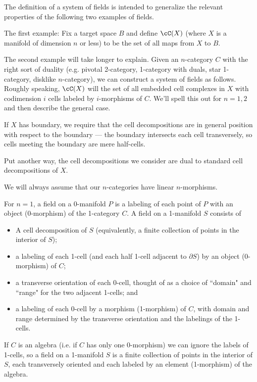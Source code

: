 \documentclass[11pt,leqno]{article}
\def\bd{\partial}
\begin{document}
The definition of a system of fields is intended to generalize 
the relevant properties of the following two examples of fields.

The first example: Fix a target space $B$ and define $\cC(X)$ (where $X$
is a manifold of dimension $n$ or less) to be the set of 
all maps from $X$ to $B$.

The second example will take longer to explain.
Given an $n$-category $C$ with the right sort of duality 
(e.g. pivotal 2-category, 1-category with duals, star 1-category, disklike $n$-category), 
we can construct a system of fields as follows.
Roughly speaking, $\cC(X)$ will the set of all embedded cell complexes in $X$
with codimension $i$ cells labeled by $i$-morphisms of $C$.
We'll spell this out for $n=1,2$ and then describe the general case.

If $X$ has boundary, we require that the cell decompositions are in general
position with respect to the boundary --- the boundary intersects each cell
transversely, so cells meeting the boundary are mere half-cells.

Put another way, the cell decompositions we consider are dual to standard cell
decompositions of $X$.

We will always assume that our $n$-categories have linear $n$-morphisms.

For $n=1$, a field on a 0-manifold $P$ is a labeling of each point of $P$ with
an object (0-morphism) of the 1-category $C$.
A field on a 1-manifold $S$ consists of
\begin{itemize}
	\item A cell decomposition of $S$ (equivalently, a finite collection
of points in the interior of $S$);
	\item a labeling of each 1-cell (and each half 1-cell adjacent to $\bd S$)
by an object (0-morphism) of $C$;
	\item a transverse orientation of each 0-cell, thought of as a choice of
``domain" and ``range" for the two adjacent 1-cells; and
	\item a labeling of each 0-cell by a morphism (1-morphism) of $C$, with
domain and range determined by the transverse orientation and the labelings of the 1-cells.
\end{itemize}

If $C$ is an algebra (i.e. if $C$ has only one 0-morphism) we can ignore the labels
of 1-cells, so a field on a 1-manifold $S$ is a finite collection of points in the 
interior of $S$, each transversely oriented and each labeled by an element (1-morphism)
of the algebra.
\end{document}
